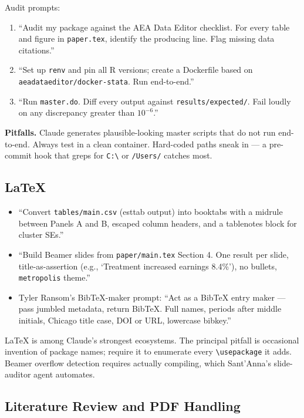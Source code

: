 \documentclass[11pt]{article}
\begin{document}
Audit prompts:
\begin{enumerate}[leftmargin=*,nosep]
    \item ``Audit my package against the AEA Data Editor checklist. For every table and figure in \texttt{paper.tex}, identify the producing line. Flag missing data citations.''
    \item ``Set up \texttt{renv} and pin all R versions; create a Dockerfile based on \texttt{aeadataeditor/docker-stata}. Run end-to-end.''
    \item ``Run \texttt{master.do}. Diff every output against \texttt{results/expected/}. Fail loudly on any discrepancy greater than $10^{-6}$.''
\end{enumerate}

\textbf{Pitfalls.} Claude generates plausible-looking master scripts that do not run end-to-end. Always test in a clean container. Hard-coded paths sneak in --- a pre-commit hook that greps for \texttt{C:\textbackslash} or \texttt{/Users/} catches most.

\subsection{\LaTeX{}}

\begin{itemize}[leftmargin=*,nosep]
    \item ``Convert \texttt{tables/main.csv} (esttab output) into booktabs with a midrule between Panels A and B, escaped column headers, and a tablenotes block for cluster SEs.''
    \item ``Build Beamer slides from \texttt{paper/main.tex} Section 4. One result per slide, title-as-assertion (e.g., `Treatment increased earnings 8.4\%'), no bullets, \texttt{metropolis} theme.''
    \item Tyler Ransom's BibTeX-maker prompt: ``Act as a BibTeX entry maker --- pass jumbled metadata, return BibTeX. Full names, periods after middle initials, Chicago title case, DOI or URL, lowercase bibkey.''
\end{itemize}

\LaTeX{} is among Claude's strongest ecosystems. The principal pitfall is occasional invention of package names; require it to enumerate every \texttt{\textbackslash usepackage} it adds. Beamer overflow detection requires actually compiling, which Sant'Anna's slide-auditor agent automates.

\subsection{Literature Review and PDF Handling}
\end{document}
